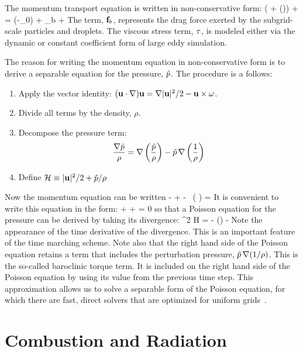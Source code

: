 The momentum transport equation is written in non-conservative form:
\be \rho \left(  + (\bu \cdot \nabla)\bu  \right) + \nabla \tp = (\rho-\rho_0) \bg + \bof_b + \nabla\!\cdot \btau  \ee
The term, ${\bf f}_b$, represents the drag force exerted by the subgrid-scale particles and droplets. The
viscous stress term, ${\bf \tau}$, is modeled either via the dynamic or constant coefficient form of large eddy simulation.

The reason for writing the momentum equation in non-conservative form is to derive a separable equation for the
pressure, $\tilde{p}$. The procedure is a follows:
\begin{enumerate}
\item Apply the vector identity: $({\bf u} \cdot \nabla) {\bf u} = \nabla|{\bf u}|^2/2 - {\bf u}\times{\bf \omega} $.
\item Divide all terms by the density, $\rho$.
\item Decompose the pressure term:
   $$ \frac{\nabla \tilde{p}}{\rho}  = \nabla \left( \frac{\tilde{p}}{\rho}\right) - \tilde{p} \, \nabla \left(\frac{1}{\rho} \right)  $$
\item Define ${\cal H} \equiv |{\bf u}|^2/2 + \tilde{p}/\rho $
\end{enumerate}
Now the momentum equation can be written
\be {} - \bu\times\bo +  - \tp \, \nabla \left( \right) =    \label{momeq} \ee
It is convenient to write this equation in the form:
\be {} + \bF + \nabla \cH = 0 \label{simple_momentum_equation} \ee
so that a Poisson equation for the pressure can be derived by taking its divergence:
\be \nabla^2 {\cal H} = - (\nabla\!\cdot \bu) - \nabla\!\cdot \bF    \label{simplephi2} \ee
Note the appearance of the time derivative of the divergence. This is an important feature of the time marching scheme.
Note also that the right hand side of the Poisson equation retains a term that includes the perturbation pressure,
$\tilde{p} \, \nabla (1/\rho)$. This is the so-called baroclinic torque term.
It is included on the right hand side of the Poisson equation by using its value from the previous time step. This
approximation allows us to solve a separable form of the Poisson equation, for which there are fast, direct solvers that
are optimized for uniform grids~\cite{Sweet:1}.

\section{Combustion and Radiation}

